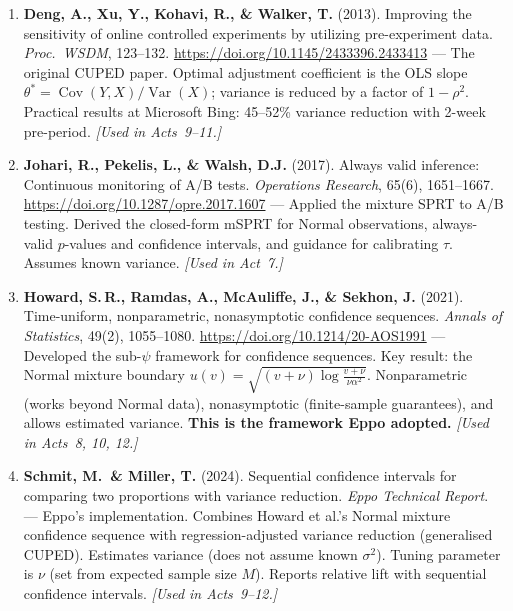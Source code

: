 \documentclass[12pt, a4paper]{article}
\newcommand{\Var}{\operatorname{Var}}
\newcommand{\Cov}{\operatorname{Cov}}
\begin{document}
\begin{enumerate}
  \item \textbf{Deng, A., Xu, Y., Kohavi, R., \& Walker, T.} (2013).
        Improving the sensitivity of online controlled experiments by
        utilizing pre-experiment data.
        \textit{Proc.\ WSDM}, 123--132.
        \url{https://doi.org/10.1145/2433396.2433413}
        --- The original CUPED paper.  Optimal adjustment coefficient is the
        OLS slope $\theta^* = \Cov(Y,X)/\Var(X)$; variance is reduced by a
        factor of $1-\rho^2$.  Practical results at Microsoft Bing: 45--52\%
        variance reduction with 2-week pre-period.
        \textit{[Used in Acts~9--11.]}

  \item \textbf{Johari, R., Pekelis, L., \& Walsh, D.J.} (2017).
        Always valid inference: Continuous monitoring of A/B tests.
        \textit{Operations Research}, 65(6), 1651--1667.
        \url{https://doi.org/10.1287/opre.2017.1607}
        --- Applied the mixture SPRT to A/B testing.  Derived the closed-form
        mSPRT for Normal observations, always-valid $p$-values and confidence
        intervals, and guidance for calibrating $\tau$.  Assumes known
        variance.
        \textit{[Used in Act~7.]}

  \item \textbf{Howard, S.\,R., Ramdas, A., McAuliffe, J., \& Sekhon, J.}
        (2021).
        Time-uniform, nonparametric, nonasymptotic confidence sequences.
        \textit{Annals of Statistics}, 49(2), 1055--1080.
        \url{https://doi.org/10.1214/20-AOS1991}
        --- Developed the sub-$\psi$ framework for confidence sequences.
        Key result: the Normal mixture boundary
        $u(v) = \sqrt{(v+\nu)\log\frac{v+\nu}{\nu\alpha^2}}$.
        Nonparametric (works beyond Normal data), nonasymptotic (finite-sample
        guarantees), and allows estimated variance.  \textbf{This is the
        framework Eppo adopted.}
        \textit{[Used in Acts~8, 10, 12.]}

  \item \textbf{Schmit, M.\ \& Miller, T.} (2024).
        Sequential confidence intervals for comparing two proportions with
        variance reduction.
        \textit{Eppo Technical Report}.
        --- Eppo's implementation.  Combines Howard et al.'s Normal mixture
        confidence sequence with regression-adjusted variance reduction
        (generalised CUPED).  Estimates variance (does not assume known
        $\sigma^2$).  Tuning parameter is $\nu$ (set from expected sample
        size $M$).  Reports relative lift with sequential confidence intervals.
        \textit{[Used in Acts~9--12.]}
\end{enumerate}
\end{document}
